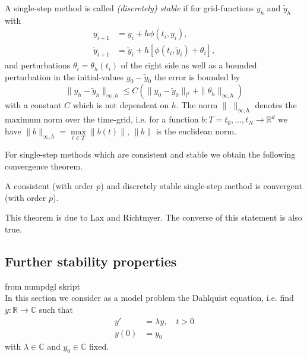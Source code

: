 	\begin{definition}\label{Discrete_Stability_SingleStep - lecture notes for numpdgl}
		A single-step method is called \emph{(discretely) stable} if for grid-functions $y_h$ and $\tilde{y}_h$ with
		\begin{align}
			y_{i+1} &= y_i + h \phi(t_i, y_i), \\
			\tilde{y}_{i+1} &=  \tilde{y}_i + h [\phi(t_i, \tilde{y}_i) + \theta_i],
		\end{align}
		and perturbations $\theta_i = \theta_h(t_i)$ of the right side as well as a bounded perturbation in the initial-values $y_0 - \tilde{y}_0$ the error is bounded by
		\begin{displaymath}
			\|y_h - \tilde{y}_h\|_{\infty,h} \leq C (\|y_0 - \tilde{y}_0\|_{l^2} + \|\theta_h\|_{\infty,h})
		\end{displaymath}
		with a constant $C$ which is not dependent on $h$. The norm $\|.\|_{\infty,h}$ denotes the maximum norm over the time-grid, i.e. for a function $b: T={t_0,...,t_N} \to \mathbb{R}^d$ we have $\|b\|_{\infty,h} = \max\limits_{t \in T}\|b(t)\|$, $\|b\|$ is the euclidean norm.
	\end{definition}
	
	For single-step methods which are consistent and stable we obtain the following convergence theorem.
	
	\begin{theorem}\label{Lax-Richtmyer}
		A consistent (with order $p$) and discretely stable single-step method is convergent (with order $p$).
	\end{theorem}
	
	This theorem is due to Lax and Richtmyer. The converse of this statement is also true. 

	\subsection{Further stability properties}
		from numpdgl skript \\
		In this section we consider as a model problem the Dahlquist equation, i.e. find $y:\mathbb{R} \to \mathbb{C}$ such that
		\begin{align}
			y' &= \lambda y, \quad t > 0 \\
			y(0) &= y_0
		\end{align}
		with $\lambda \in \mathbb{C}$ and $y_0 \in \mathbb{C}$ fixed.
		
